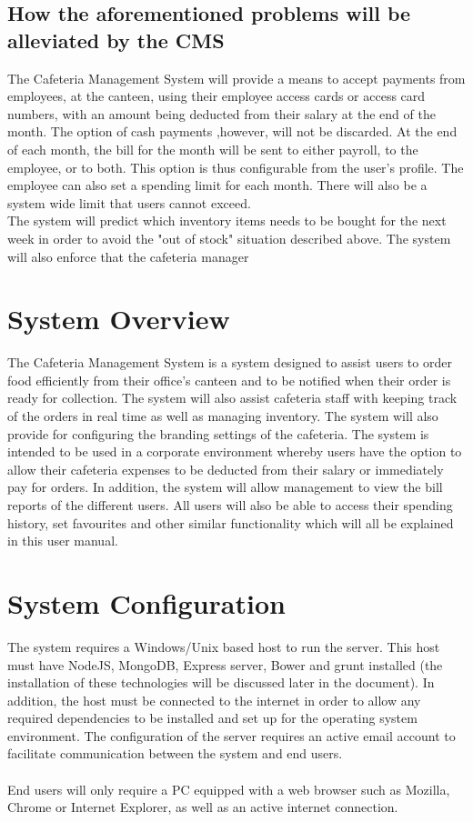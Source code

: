 \documentclass[a4paper,12pt]{report}
\begin{document}
\subsection{How the aforementioned problems will be alleviated by the CMS}
The Cafeteria Management System will provide a means to accept payments from employees, at the canteen, using their employee access cards or access card numbers, with an amount being deducted from their salary at the end of the month.  The option of cash payments ,however, will not be discarded. At the end of each month, the bill for the month will be sent to either payroll, to the employee, or to both. This option is thus configurable from the user's profile. The employee can also set a spending limit for each month. There will also be a system wide limit that users cannot exceed.
\\
The system will predict which inventory items needs to be bought for the next week in order to avoid the "out of stock" situation described above. The system will also enforce that the cafeteria manager 
\\
\section{System Overview}
The Cafeteria Management System is a system designed to assist users to order food efficiently from their office's canteen and to be notified when their order is ready for collection. The system will also assist cafeteria staff with keeping track of the orders in real time as well as managing inventory. The system will also provide for configuring the branding settings of the cafeteria. The system is intended to be used in a corporate environment whereby users have the option to allow their cafeteria expenses to be deducted from their salary or immediately pay for orders. In addition, the system will allow management to view the bill reports of the different users. All users will also be able to access their spending history, set favourites and other similar functionality which will all be explained in this user manual. \\

\section{System Configuration}
The system requires a Windows/Unix based host to run the server. This host must have NodeJS, MongoDB, Express server, Bower and grunt  installed (the installation of these technologies will be discussed later in the document). In addition, the host must be connected to the internet in order to allow any required dependencies to be installed and set up for the operating system environment. The configuration of the server requires an active email account to facilitate communication between the system and end users. \\ 
\\
End users will only require a PC equipped with a web browser such as Mozilla, Chrome or Internet Explorer, as well as an active internet connection.
\end{document}
